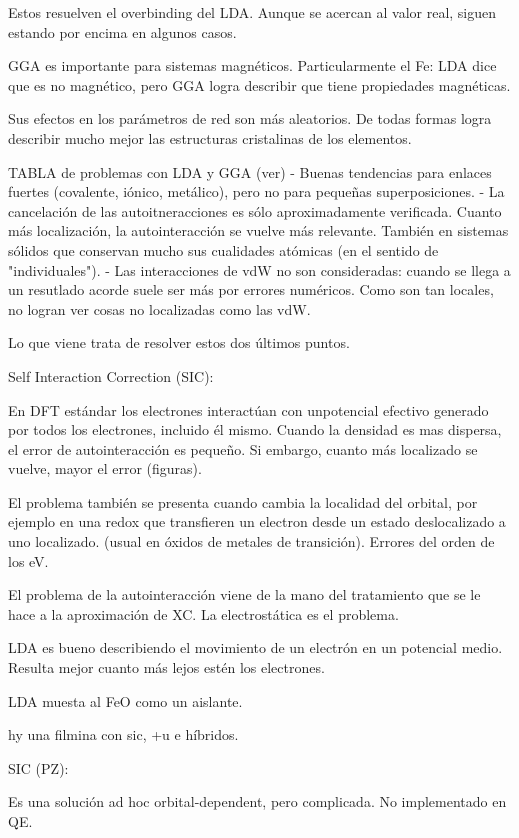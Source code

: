   Estos resuelven el overbinding del LDA. Aunque se acercan al valor real, siguen estando por encima en algunos casos.

  GGA es importante para sistemas magnéticos. Particularmente el Fe: LDA dice que es no magnético, pero GGA logra describir que tiene propiedades magnéticas.

  Sus efectos en los parámetros de red son más aleatorios. De todas formas logra describir mucho mejor las estructuras cristalinas de los elementos.


  TABLA de problemas con LDA y GGA (ver)
  - Buenas tendencias para enlaces fuertes (covalente, iónico, metálico), pero no para pequeñas superposiciones.
  - La cancelación de las autoitneracciones es sólo aproximadamente verificada. Cuanto más localización, la autointeracción se vuelve más relevante. También en sistemas sólidos que conservan mucho sus cualidades atómicas (en el sentido de "individuales").
  - Las interacciones de vdW no son consideradas: cuando se llega a un resutlado acorde suele ser más por errores numéricos. Como son tan locales, no logran ver cosas no localizadas como las vdW.

  Lo que viene trata de resolver estos dos últimos puntos.

  Self Interaction Correction (SIC):

  En DFT estándar los electrones interactúan con unpotencial efectivo generado por todos los electrones, incluido él mismo. Cuando la densidad es mas dispersa, el error de autointeracción es pequeño. Si embargo, cuanto más localizado se vuelve, mayor el error  (figuras).

  El problema también se presenta cuando cambia la localidad del orbital, por ejemplo en una redox que transfieren un electron desde un estado deslocalizado a uno localizado. (usual en óxidos de metales de transición). Errores del orden de los eV.

  El problema de la autointeracción viene de la mano del tratamiento que se le hace a la aproximación de XC. La electrostática es el problema.

  LDA es bueno describiendo el movimiento de un electrón en un potencial medio. Resulta mejor cuanto más lejos estén los electrones.

  LDA muesta al FeO como un aislante.

  hy una filmina con sic, +u e híbridos.

  SIC (PZ):

  Es una solución ad hoc orbital-dependent, pero complicada. No implementado en QE.

